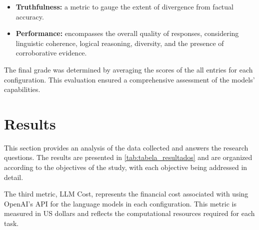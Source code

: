             \begin{itemize}
                
                \item \textbf{Truthfulness:} a metric to gauge the extent of divergence from factual accuracy.
        
                \item  \textbf{Performance:} encompasses the overall quality of responses, considering linguistic coherence, logical reasoning, diversity, and the presence of corroborative evidence.
                
            \end{itemize}
            
            The final grade was determined by averaging the scores of the all entries for each configuration. This evaluation ensured a comprehensive assessment of the models' capabilities.

            
    \section{Results}

        This section provides an analysis of the data collected and answers the research questions. The results are presented in \autoref{tab:tabela_resultados} and are organized according to the objectives of the study, with each objective being addressed in detail.

        The third metric, LLM Cost, represents the financial cost associated with using OpenAI's API for the language models in each configuration. This metric is measured in US dollars and reflects the computational resources required for each task.
                
